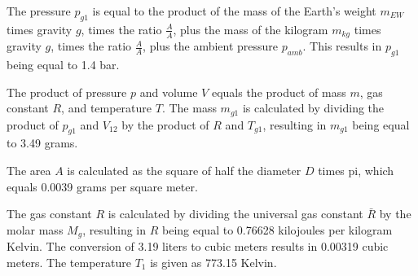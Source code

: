 The pressure \( p_{g1} \) is equal to the product of the mass of the Earth's weight \( m_{EW} \) times gravity \( g \), times the ratio \( \frac{A}{A} \), plus the mass of the kilogram \( m_{kg} \) times gravity \( g \), times the ratio \( \frac{A}{A} \), plus the ambient pressure \( p_{amb} \). This results in \( p_{g1} \) being equal to 1.4 bar.

The product of pressure \( p \) and volume \( V \) equals the product of mass \( m \), gas constant \( R \), and temperature \( T \). The mass \( m_{g1} \) is calculated by dividing the product of \( p_{g1} \) and \( V_{12} \) by the product of \( R \) and \( T_{g1} \), resulting in \( m_{g1} \) being equal to 3.49 grams.

The area \( A \) is calculated as the square of half the diameter \( D \) times pi, which equals 0.0039 grams per square meter.

The gas constant \( R \) is calculated by dividing the universal gas constant \( \bar{R} \) by the molar mass \( M_g \), resulting in \( R \) being equal to 0.76628 kilojoules per kilogram Kelvin. The conversion of 3.19 liters to cubic meters results in 0.00319 cubic meters. The temperature \( T_1 \) is given as 773.15 Kelvin.